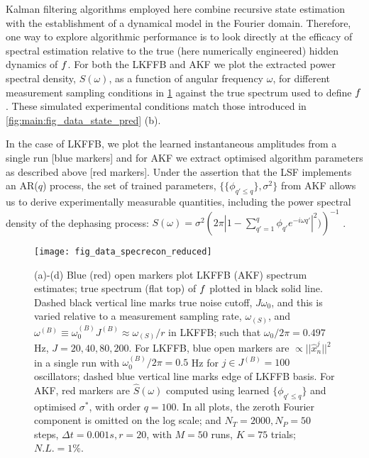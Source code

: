 Kalman filtering algorithms employed here combine recursive state estimation with the establishment of a dynamical model in the Fourier domain.  Therefore, one way to explore algorithmic performance is to look directly at the efficacy of spectral estimation relative to the true (here numerically engineered) hidden dynamics of $f$.  For both the LKFFB and AKF we plot the extracted power spectral density, $S(\omega)$, as a function of angular frequency $\omega$, for different measurement sampling conditions in \cref{fig:main:fig_data_specrecon} against the true spectrum used to define $f$.  These simulated experimental conditions match those introduced in \cref{fig:main:fig_data_state_pred} (b). 

In the case of LKFFB, we plot the learned instantaneous amplitudes from a single run [blue markers] and for AKF we extract optimised algorithm parameters as described above [red markers]. Under the assertion that the LSF implements an AR($q$) process, the set of trained parameters, $\{  \{\phi_{q' \leq q}\}, \sigma^2\}$ from AKF allows us to derive experimentally measurable quantities, including the power spectral density of the dephasing process: $S(\omega) = \sigma^2 \left(2 \pi |1 - \sum_{q'=1}^q \phi_{q'} e^{-i\omega q'}|^2)\right)^{-1} $ \cite{brockwell1996introduction}.  

\begin{figure}[tp]
	\texttt{[image: fig\_data\_specrecon\_reduced]}
	\caption{\label{fig:main:fig_data_specrecon} (a)-(d) Blue (red) open markers plot LKFFB (AKF) spectrum estimates; true spectrum (flat top) of $f$ plotted in black solid line. Dashed black vertical line marks true noise cutoff, $J\omega_0$, and this is varied relative to a measurement sampling rate, $\omega_{(S)}$, and $\omega^{(B)}\equiv \omega_0^{(B)} J^{(B)} \approx \omega_{(S)}/r $ in LKFFB; such that $\omega_0 / 2\pi = 0.497$ Hz, $J = 20, 40, 80, 200$. For LKFFB, blue open markers are $\propto ||\hat{x}^j_n||^2 $ in a single run with $\omega_0^{(B)} / 2\pi = 0.5$ Hz for $j \in J^{(B)} = 100$ oscillators; dashed blue vertical line marks edge of LKFFB basis. For AKF,  red markers are $\hat{S}(\omega)$ computed using learned $\{\phi_{q' \leq q}\}$ and optimised $\sigma^*$, with order $q = 100$.  In all plots, the zeroth Fourier component is omitted on the log scale; and $N_T = 2000, N_P = 50$ steps, $\Delta t = 0.001s, r=20$, with $M=50$ runs, $K=75$ trials; $N.L. = 1\%$.} 
\end{figure} 

